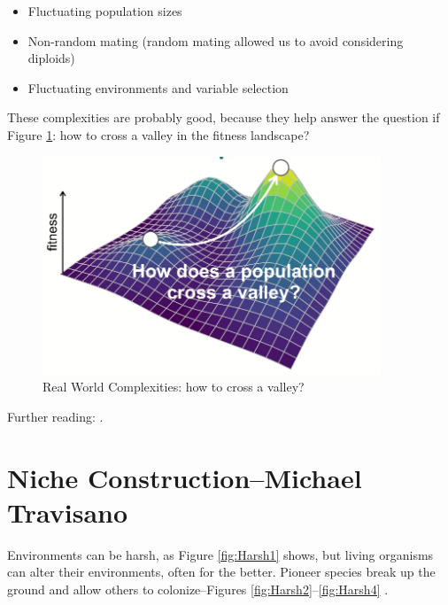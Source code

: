 \documentclass[]{article}
\begin{document}
\begin{itemize}
	\item  Fluctuating population sizes
	\item  Non-random mating (random mating allowed us to avoid considering diploids)
	\item  Fluctuating environments and variable selection
\end{itemize}

These complexities are probably good, because they help answer the question if Figure \ref{fig:RealWorldComplexities}: how to cross a valley in the fitness landscape?
\begin{figure}[H]
	\caption{Real World Complexities: how to cross a valley?}\label{fig:RealWorldComplexities}
	\includegraphics[width=0.9\textwidth]{RealWorldComplexities}
\end{figure}

Further reading: \cite{gillespie1984molecular,kauffman1989nk,kimura1983neutral,kingman2000origins,patwa2008fixation,poelwijk2007empirical,rosenberg2002genealogical}.

\section[Niche Construction]{Niche Construction--Michael Travisano}

Environments can be harsh, as Figure \ref{fig:Harsh1} shows, but living organisms can alter their environments, often for the better. Pioneer species break up the ground and allow others to colonize--Figures \ref{fig:Harsh2}--\ref{fig:Harsh4} . 
\end{document}
